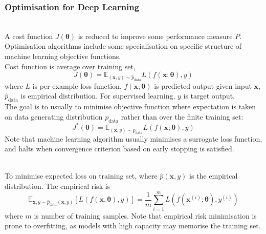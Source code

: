 \subsubsection{Optimisation for Deep Learning}

\begin{remark} \\
A cost function $J(\bm{\theta})$ is reduced to improve some performance measure $P$.\\
Optimisation algorithms include some specialisation on specific structure of machine learning objective functions.\\
Cost function is average over training set,
\begin{equation}
J(\bm{\theta}) = \mathbb{E}_{(\bm{x}, y) \sim \hat{p}_{\text{data}}} L(f(\bm{x}; \bm{\theta}), y) \nonumber
\end{equation}
where $L$ is per-example loss function, $f(\bm{x}; \bm{\theta})$ is predicted output given input $\bm{x}$, $\hat{p}_{\text{data}}$ is empirical distribution. For supervised learning, $y$ is target output.\\
The goal is to usually to minimise objective function where expectation is taken on data generating distribution $p_{\text{data}}$ rather than over the finite training set:
\begin{equation}
J^*(\bm{\theta}) = \mathbb{E}_{(\bm{x}, y) \sim p_{\text{data}}} L(f(\bm{x}; \bm{\theta}), y) \nonumber
\end{equation}
Note that machine learning algorithm usually minimises a surrogate loss function, and halts when convergence criterion based on early  stopping is satisfied.
\end{remark}

\begin{definition} \\
To minimise expected loss on training set, where $\hat{p}(\bm{x}, y)$ is the empirical distribution. The empirical risk is
\begin{equation}
\mathbb{E}_{\bm{x}, y \sim \hat{p}_{\text{data}}(\bm{x}, y)}[L(f(\bm{x}, \bm{\theta}), y)] = \frac{1}{m} \sum\limits_{i=1}^m L(f(\bm{x}^{(i)}; \bm{\theta}), y^{(i)}) \nonumber
\end{equation}
where $m$ is number of training samples. Note that empirical risk minimisation is prone to overfitting, as models with high capacity may memorise the training set.
\end{definition}


